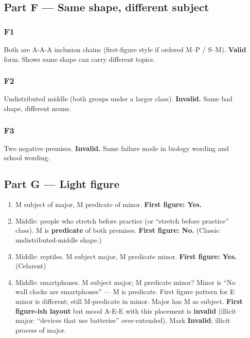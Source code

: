 \documentclass[11pt]{article}
\begin{document}
\subsection*{Part F --- Same shape, different subject}
\subsubsection*{F1}
Both are A-A-A inclusion chains (first-figure style if ordered M--P / S--M). \textbf{Valid} form. Shows same shape can carry different topics.

\subsubsection*{F2}
Undistributed middle (both groups under a larger class). \textbf{Invalid.} Same bad shape, different nouns.

\subsubsection*{F3}
Two negative premises. \textbf{Invalid.} Same failure mode in biology wording and school wording.

\subsection*{Part G --- Light figure}
\begin{enumerate}
\item M subject of major, M predicate of minor. \textbf{First figure: Yes.}
\item Middle: people who stretch before practice (or ``stretch before practice'' class). M is \textbf{predicate} of both premises. \textbf{First figure: No.} (Classic undistributed-middle shape.)
\item Middle: reptiles. M subject major, M predicate minor. \textbf{First figure: Yes.} (Celarent)
\item Middle: smartphones. M subject major; M predicate minor? Minor is ``No wall clocks are smartphones'' --- M is predicate. First figure pattern for E minor is different; still M-predicate in minor. Major has M as subject. \textbf{First figure-ish layout} but mood A-E-E with this placement is \textbf{invalid} (illicit major: ``devices that use batteries'' over-extended). Mark \textbf{Invalid}; illicit process of major.
\end{enumerate}
\end{document}
